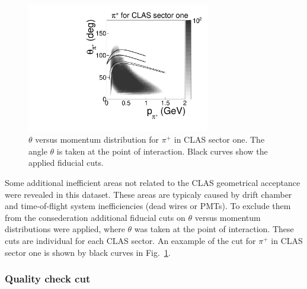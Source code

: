 \documentclass[prc,twocolumn,superscriptaddress,showpacs,amssymb,amsmath,amsfonts,linenumbers,aps]{revtex4-1}
\begin{document}
\begin{figure}[htp]
\begin{center}
 \includegraphics[width=8cm,keepaspectratio]{pictures/fiducial_cuts/th_vs_p_pip.pdf} 
\vspace{-0.1cm}
\caption{$\theta$ versus momentum distribution for $\pi^{+}$ in CLAS sector one. The angle $\theta$ is taken at the point of interaction. Black curves show the applied fiducial cuts.}
\label{fig:fid_cuts_th_vs_p}
\end{center}
\end{figure}




Some additional inefficient areas not related to the CLAS geometrical acceptance were revealed in this dataset. These areas are typicaly caused by drift chamber and time-of-flight system inefficiencies (dead wires or PMTs).  To exclude them from the consederation additional fiducial cuts on $\theta$ versus momentum distributions were applied, where $\theta$ was taken at the point of interaction.  These cuts are individual for each CLAS sector. An eaxample of the cut for $\pi^{+}$ in CLAS sector one is shown by black curves in Fig.~\ref{fig:fid_cuts_th_vs_p}. 

 


\subsubsection{Quality check cut}
\end{document}
